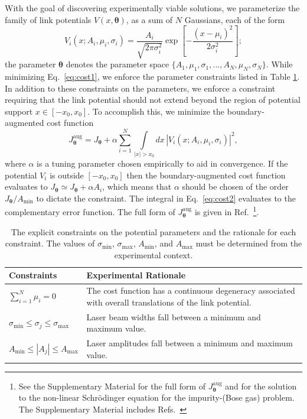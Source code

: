 \documentclass[twocolumn,amsmath,amssymb,showpacs,pra,superscriptaddress,aps]{revtex4-1}
\begin{document}
With the goal of discovering experimentally viable solutions, we parameterize the family of link potentials $V(x, \bm{\theta})$, as a sum of $N$ Gaussians, each of the form
\begin{equation}\label{eq:V-param}
V_i(x; A_i, \mu_i, \sigma_i) = \frac{A_i}{\sqrt{2\pi\sigma_i^2}}\exp\left[{-\frac{(x-\mu_i)^2}{2\sigma_i^2}}\right];
\end{equation}
the parameter $\bm{\theta}$ denotes the parameter space $\{A_1, \mu_1, \sigma_1,...,A_N, \mu_N, \sigma_N\}$. While minimizing Eq.~\eqref{eq:cost1}, we enforce the parameter constraints listed in Table \ref{tab:constraints}. In addition to these constraints on the parameters, we enforce a constraint requiring that the link potential should not extend beyond the region of potential support $x\in[-x_0,x_0]$. 
To accomplish this, we minimize the boundary-augmented cost function
\begin{equation}\label{eq:cost2}
  J_{\bm{\theta}}^{\mathrm{aug}} = J_{\bm{\theta}} + \alpha \sum_{i=1}^N\int\limits_{|x|>x_0}dx\,|V_i(x; A_i,\mu_i,\sigma_i)|^2,
\end{equation}
where $\alpha$ is a tuning parameter chosen empirically to aid in convergence. 
 If the potential $V_i$ is outside $[-x_0,x_0]$ then the boundary-augmented 
cost function evaluates to $J_{\bm{\theta}}\simeq J_{\bm{\theta}} +\alpha A_i$, which means that $\alpha$
should be chosen of the order $J_{\bm{\theta}}/A_{\mathrm{min}}$ to dictate the constraint.
 The integral in Eq.~\eqref{eq:cost2} evaluates to the complementary error function. The full form of $J_{\bm{\theta}}^{\mathrm{aug}}$ is given in Ref.~\footnote{See the Supplementary Material for the full form of $J_{\bm{\theta}}^{\mathrm{aug}}$ and 
for the solution to the non-linear Schr{\"o}dinger equation for the impurity-(Bose gas) problem. The Supplementary Material includes Refs.~\cite{tsuzuki1971,ishikawa1980}}.

\begin{table}[t]
  \renewcommand*{\arraystretch}{1.4}
  \begin{tabular}{m{3cm}|m{5.5cm}}
    Constraints & Experimental Rationale \\
    \hline\hline
    $\sum_{i=1}^{N}\mu_i = 0$ & The cost function has a continuous degeneracy associated with overall translations of the link potential. \\
    \hline
    $\sigma_{\mathrm{min}} \leq \sigma_j \leq \sigma_{\mathrm{max}} $ & Laser beam widths fall between a minimum and maximum value.\\
    \hline
    $A_{\mathrm{min}} \leq |A_j| \leq A_{\mathrm{max}}$ & Laser amplitudes fall between a minimum and maximum value.
  \end{tabular}
  \caption{The explicit constraints on the potential parameters and the rationale for each constraint. The values of $\sigma_{\mathrm{min}}$, $\sigma_{\mathrm{max}}$, $A_{\mathrm{min}}$, and $A_{\mathrm{max}}$ must be determined from the experimental context.}
  \label{tab:constraints}
\end{table}
\end{document}
